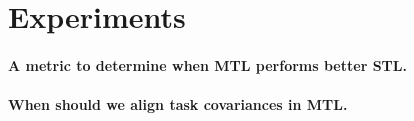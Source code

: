 \section{Experiments}

\paragraph{A metric to determine when MTL performs better STL.}

\paragraph{When should we align task covariances in MTL.}